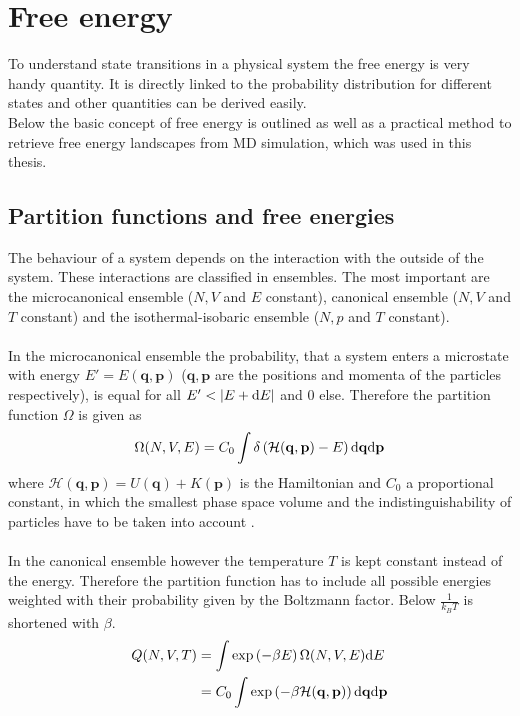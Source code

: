\section{Free energy}
To understand state transitions in a physical system the free energy is very handy quantity. It is directly linked to the probability distribution for different states and other quantities can be derived easily.\\
Below the basic concept of free energy is outlined as well as a practical method to retrieve free energy landscapes from MD simulation, which was used in this thesis.
\subsection{Partition functions and free energies}
The behaviour of a system depends on the interaction with the outside of the system. These interactions are classified in ensembles. The most important are the microcanonical ensemble ($N, V$ and $E$ constant), canonical ensemble ($N, V$ and $T$ constant) and the isothermal-isobaric ensemble ($N, p$ and $T$ constant).\\
\\
In the microcanonical ensemble the probability, that a system enters a microstate with energy $E' = E(\mathbf{q}, \mathbf{p})$ ($\mathbf{q}, \mathbf{p}$ are the positions and momenta of the particles respectively), is equal for all $E' < \left|E + \text{d} E\right|$ and $0$ else. Therefore the partition function $\Omega$ is given as
\begin{equation}
\Omega(N, V, E) = C_0 \int \delta\left(\mathcal{H}(\mathbf{q}, \mathbf{p}) - E\right) \text{d} \mathbf{q} \text{d} \mathbf{p}
\end{equation}
where $\mathcal{H}(\mathbf{q}, \mathbf{p}) = U(\mathbf{q}) + K(\mathbf{p})$ is the Hamiltonian and $C_0$ a proportional constant, in which the smallest phase space volume and the indistinguishability of particles have to be taken into account \autocite[16]{freeEnergyBook}.%
\\
\\
In the canonical ensemble however the temperature $T$ is kept constant instead of the energy. Therefore the partition function has to include all possible energies weighted with their probability given by the Boltzmann factor. Below $\frac{1}{k_B T}$ is shortened with $\beta$.
\begin{align}
Q(N, V, T) &= \int \exp\left(-\beta E\right) \Omega(N, V, E) \text{d} E\\
&= C_0 \int \exp\left(-{\beta\mathcal{H}(\mathbf{q}, \mathbf{p})}\right) \text{d} \mathbf{q} \text{d} \mathbf{p}
\end{align}
